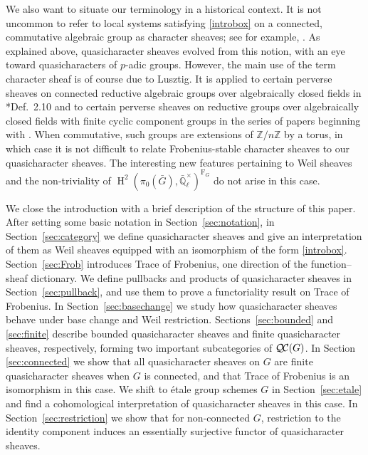 \documentclass{amsart}
\theoremstyle{plain}
\theoremstyle{definition}
\theoremstyle{remark}
\newcommand{\ZZ}{{\mathbb{Z}}}
\newcommand{\EE}{\mathbb{\bar Q}_\ell}
\newcommand{\Fq}{k}
\newcommand{\EEx}{\EE^\times}
\newcommand{\Frob}[1]{\operatorname{F}_{#1}}
\DeclareMathOperator{\Hh}{H}
\newcommand{\QC}{{\mathcal{Q\hskip-0.8pt C}}}
\begin{document}
We also want to situate our terminology in a historical context.
It is not uncommon to refer to local systems satisfying \eqref{introbox} on a connected, commutative algebraic group as character sheaves;
see for example, \cite{kamgarpour:09a}.
As explained above, quasicharacter sheaves evolved from this notion,
with an eye toward quasicharacters of $p$-adic groups.
However, the main use of the term character sheaf is of course due to Lusztig.
It is applied to certain perverse sheaves on connected reductive algebraic groups over algebraically closed fields in
\cite{lusztig:85a}*{Def.~2.10} and to certain perverse sheaves on reductive groups
over algebraically closed fields with finite cyclic component groups in the series of papers
beginning with \cite{lusztig:disconnected1}.
When commutative, such groups are extensions of $\ZZ/n\ZZ$ by a torus,
in which case it is not difficult to relate Frobenius-stable character sheaves to our quasicharacter sheaves.
The interesting new features pertaining to Weil sheaves and the non-triviality of $\Hh^2(\pi_0({\bar G}),\EEx)^{\Frob{G}}$ do not arise in this case.



We close the introduction with a brief description of the structure of this paper.
After setting some basic notation in Section~\ref{sec:notation},
in Section~\ref{sec:category} we define quasicharacter sheaves and give an interpretation of
them as Weil sheaves equipped with an isomorphism of the form \eqref{introbox}.
Section~\ref{sec:Frob} introduces Trace of Frobenius,
one direction of the function--sheaf dictionary.
We define pullbacks and products of quasicharacter sheaves in Section~\ref{sec:pullback}, and use
them to prove a functoriality result on Trace of Frobenius.
In Section~\ref{sec:basechange} we study how quasicharacter sheaves behave under base change
and Weil restriction.
Sections~\ref{sec:bounded} and \ref{sec:finite} describe bounded quasicharacter sheaves and finite quasicharacter sheaves, respectively,
forming two important subcategories of $\QC(G)$.
In Section \ref{sec:connected} we show that all quasicharacter sheaves on $G$ are finite quasicharacter sheaves when $G$ is connected, and that Trace of Frobenius is an isomorphism in this case.
We shift to \'etale group schemes $G$ in Section~\ref{sec:etale} and find a cohomological interpretation
of quasicharacter sheaves in this case.
In Section~\ref{sec:restriction} we show that for non-connected $G$, restriction to the identity component
induces an essentially surjective functor of quasicharacter sheaves.
\end{document}

